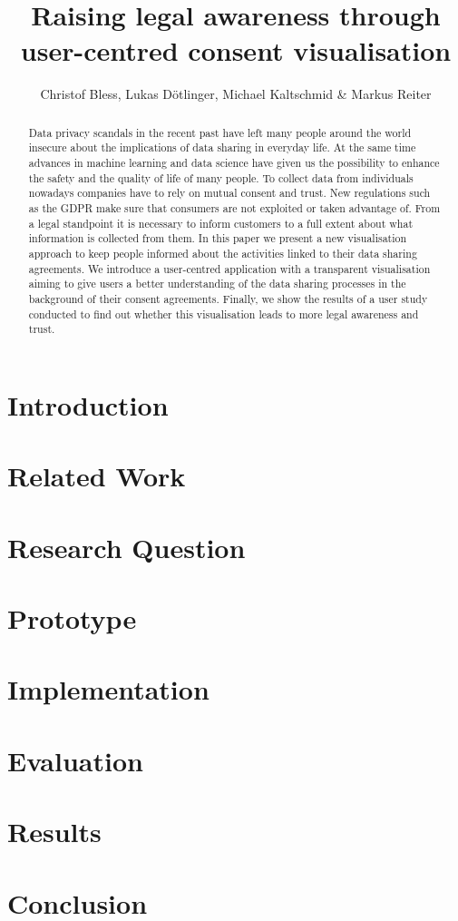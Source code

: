 \documentclass[notitlepage,11pt]{article}
\title{Raising legal awareness through user-centred consent visualisation}
\author{Christof Bless, Lukas Dötlinger, Michael Kaltschmid \& Markus Reiter}
\begin{document}
\maketitle

\begin{abstract}
  Data privacy scandals in the recent past have left many people around the world
  insecure about the implications of data sharing in everyday life. At the
  same time advances in machine learning and data science have given us the
  possibility to enhance the safety and the quality of life of many people. To
  collect data from individuals nowadays companies have to rely on mutual
  consent and trust. New regulations such as the GDPR make sure that consumers
  are not exploited or taken advantage of. From a legal standpoint it is
  necessary to inform customers to a full extent about what information is
  collected from them. In this paper we present a new visualisation approach
  to keep people informed about the activities linked to their data sharing
  agreements. We introduce a user-centred application with a transparent
  visualisation aiming to give users a better understanding of the data sharing
  processes in the background of their consent agreements. Finally, we show
  the results of a user study conducted to find out whether this
  visualisation leads to more legal awareness and trust.
\end{abstract}

\section{Introduction}
\label{sec:introduction}


\section{Related Work}
\label{sec:related_work}


\section{Research Question}
\label{sec:research_question}


\section{Prototype}
\label{sec:prototyping}


\section{Implementation}
\label{sec:implementation}


\section{Evaluation}
\label{sec:evaluation}


\section{Results}
\label{sec:results}


\section{Conclusion}
\label{sec:conclusion}


\newpage
\printbibliography
\end{document}
